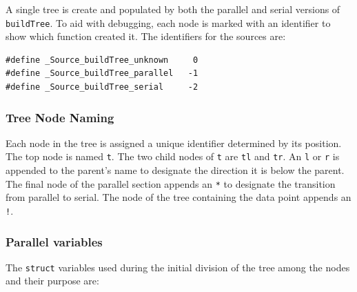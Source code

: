 \documentclass{article}
\begin{document}
A single tree is create and populated by both the parallel and serial versions of \texttt{buildTree}. To aid with debugging, each node is marked with an identifier to show which function created it. The identifiers for the sources are:

\lstset{language=C++, keepspaces=true}
\begin{lstlisting}
#define _Source_buildTree_unknown     0
#define _Source_buildTree_parallel   -1
#define _Source_buildTree_serial     -2
\end{lstlisting}

%
%

\subsubsection{Tree Node Naming}

Each node in the tree is assigned a unique identifier determined by its position. The top node is named \texttt{t}. The two child nodes of \texttt{t} are \texttt{tl} and \texttt{tr}. An \texttt{l} or \texttt{r} is appended to the parent's name to designate the direction it is below the parent. The final node of the parallel section appends an \texttt{*} to designate the transition from parallel to serial. The node of the tree containing the data point appends an \texttt{!}.


%
%

\subsubsection{Parallel variables}

The \texttt{struct} variables used during the initial division of the tree among the nodes and their purpose are:
\end{document}
